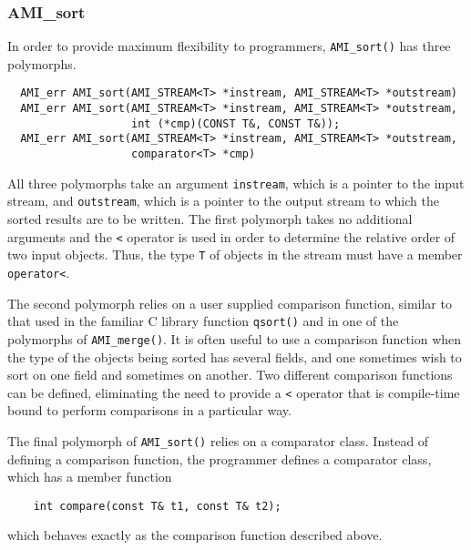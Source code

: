\subsubsection{AMI\_sort}

In order to provide maximum flexibility to programmers, \verb|AMI_sort()|
has three polymorphs.

\begin{verbatim}
  AMI_err AMI_sort(AMI_STREAM<T> *instream, AMI_STREAM<T> *outstream)
  AMI_err AMI_sort(AMI_STREAM<T> *instream, AMI_STREAM<T> *outstream,
                   int (*cmp)(CONST T&, CONST T&));
  AMI_err AMI_sort(AMI_STREAM<T> *instream, AMI_STREAM<T> *outstream,
                   comparator<T> *cmp)
\end{verbatim}

All three polymorphs take an argument \verb|instream|, which is a pointer
to the input stream, and \verb|outstream|, which is a pointer to the output
stream to which the sorted results are to be written. The first polymorph
takes no additional arguments and the \verb|<| operator is used in order to
determine the relative order of two input objects. Thus, the type \verb|T|
of objects in the stream must have a member \verb|operator<|.

The second polymorph relies on a user supplied comparison function, similar
to that used in the familiar C library function \verb|qsort()| and in one
of the polymorphs of \verb|AMI_merge()|. It is often useful to use a
comparison function when the type of the objects being sorted has several
fields, and one sometimes wish to sort on one field and sometimes on
another.  Two different comparison functions can be defined, eliminating
the need to provide a \verb|<| operator that is compile-time bound to
perform comparisons in a particular way.

The final polymorph of \verb|AMI_sort()| relies on a comparator
class.
Instead of defining a comparison function, the programmer defines a
comparator class, which has a member function
\begin{verbatim}
    int compare(const T& t1, const T& t2);
\end{verbatim}
which behaves exactly as the comparison function described above.


